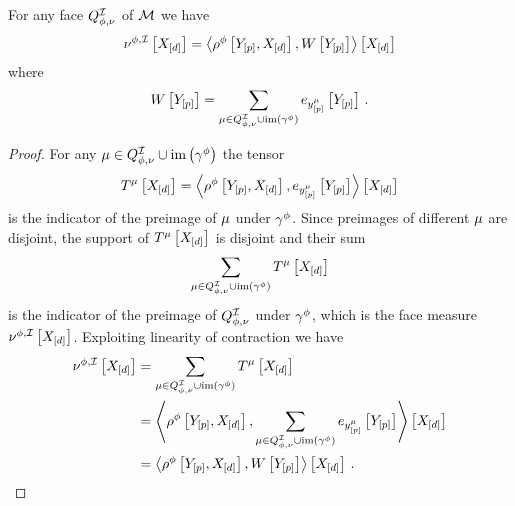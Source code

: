\begin{theorem}\label{the:faceMeasureCharacterization}
    For any face $Q^{\mathcal{I}}_{\phi,\nu}$ of $\mathcal{M}$ we have
    \begin{align*}
         \nu^{\phi,\mathcal{I}}\left[X_{[d]}\right]
         =\left\langle \rho^{\phi}\left[Y_{[p]},X_{[d]}\right],W\left[Y_{[p]}\right]\right\rangle \left[ X_{[d]} \right]
    \end{align*}
    where
    \begin{align*}
        W\left[Y_{[p]}\right]
        = \sum_{\mu\in Q^{\mathcal{I}}_{\phi,\nu}\cup\mathrm{im}\left(\gamma^{\phi}\right)} e_{y^{\mu}_{[p]}}\left[Y_{[p]}\right] \, .
    \end{align*}
\end{theorem}
\begin{proof}
    For any $\mu\in Q^{\mathcal{I}}_{\phi,\nu}\cup\mathrm{im}\left(\gamma^{\phi}\right)$ the tensor
    \begin{align*}
        T^{\mu}\left[X_{[d]}\right]
        = \left\langle \rho^{\phi}\left[Y_{[p]},X_{[d]}\right],e_{y^{\mu}_{[p]}}\left[Y_{[p]}\right]\right\rangle \left[ X_{[d]} \right]
    \end{align*}
    is the indicator of the preimage of $\mu$ under $\gamma^{\phi}$.
    Since preimages of different $\mu$ are disjoint, the support of $T^{\mu}\left[X_{[d]}\right]$ is disjoint and their sum
    \begin{align*}
        \sum_{\mu\in Q^{\mathcal{I}}_{\phi,\nu}\cup\mathrm{im}\left(\gamma^{\phi}\right)} T^{\mu}\left[X_{[d]}\right]
    \end{align*}
    is the indicator of the preimage of $Q^{\mathcal{I}}_{\phi,\nu}$ under $\gamma^{\phi}$, which is the face measure $\nu^{\phi,\mathcal{I}}\left[X_{[d]}\right]$.
    Exploiting linearity of contraction we have
    \begin{align*}
        \nu^{\phi,\mathcal{I}}\left[X_{[d]}\right]
        &= \sum_{\mu\in Q^{\mathcal{I}}_{\phi,\nu}\cup\mathrm{im}\left(\gamma^{\phi}\right)} T^{\mu}\left[X_{[d]}\right] \\
        &= \left\langle \rho^{\phi}\left[Y_{[p]},X_{[d]}\right],\sum_{\mu\in Q^{\mathcal{I}}_{\phi,\nu}\cup\mathrm{im}\left(\gamma^{\phi}\right)}e_{y^{\mu}_{[p]}}\left[Y_{[p]}\right]\right\rangle \left[ X_{[d]} \right] \\
        &= \left\langle \rho^{\phi}\left[Y_{[p]},X_{[d]}\right],W\left[Y_{[p]}\right]\right\rangle \left[ X_{[d]} \right] \, .
    \end{align*}
\end{proof}

